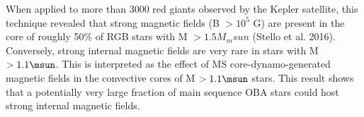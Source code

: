 When applied to more than 3000 red giants observed by the Kepler satellite, this technique revealed that
strong magnetic fields (B $> 10^5$ G) are present in the core of roughly 50\% of RGB stars with M $> 1.5M_msun$ (Stello et al. 2016).
Conversely, strong internal magnetic fields are very rare in stars with M $> 1.1\msun$. This is interpreted as the
effect of MS core-dynamo-generated magnetic fields in the convective cores of M $> 1.1\msun$ stars.
This result shows that a potentially very large fraction of main sequence OBA stars could host strong internal magnetic fields.



